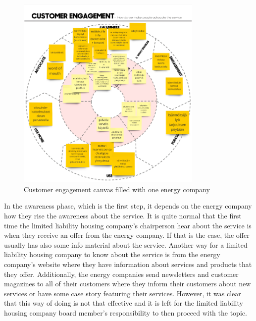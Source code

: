 \begin{figure}[ht]
  \begin{center}
    \includegraphics[width=0.80\textwidth]{dippa/images/customer-engagement.png}
    \caption{Customer engagement canvas filled with one energy company}
    \label{fig:customer-engagement}
  \end{center}
\end{figure}

In the awareness phase, which is the first step, it depends on the energy company how they rise the awareness about the service. It is quite normal that the first time the limited liability housing company's chairperson hear about the service is when they receive an offer from the energy company. If that is the case, the offer usually has also some info material about the service. Another way for a limited liability housing company to know about the service is from the energy company's website where they have information about services and products that they offer. Additionally, the energy companies send newsletters and customer magazines to all of their customers where they inform their customers about new services or have some case story featuring their services. However, it was clear that this way of doing is not that effective and it is left for the limited liability housing company board member's responsibility to then proceed with the topic.

